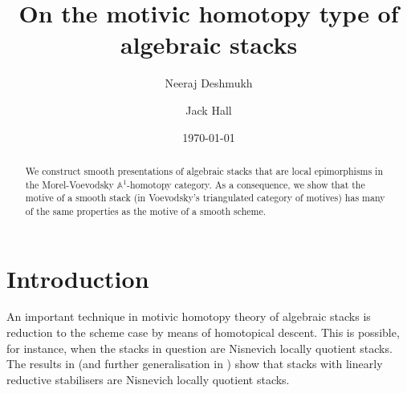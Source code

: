 \documentclass[10pt]{amsart}
\theoremstyle{plain}
\theoremstyle{definition}
\newcommand{\A}{{\mathbb A}}
\begin{document}
\title{On the motivic homotopy type of algebraic stacks}

\author{Neeraj Deshmukh}
\address{Department of Mathematics, Boyd Research and Education Center, University of Georgia, Athens, GA 30602, USA}

\author{Jack Hall}
\address{School of Mathematics \& Statistics\\The University of Melbourne\\Parkville,
  VIC, 3010\\Australia}




\date{\today}

\maketitle

\begin{abstract}
  We construct smooth presentations of algebraic stacks that are local epimorphisms in the Morel-Voevodsky $\A^1$-homotopy category. As a consequence, we show that the motive of a smooth stack (in Voevodsky's triangulated category of motives) has many of the same properties as the motive of a smooth scheme.
\end{abstract}
\section{Introduction}

An important technique in motivic homotopy theory of algebraic stacks is reduction to the scheme case by means of homotopical descent. This is possible, for instance, when the stacks in question are Nisnevich locally quotient stacks. The results in \cite{AHR19} (and further generalisation in \cite{ahhlr21}) show that stacks with linearly reductive stabilisers are Nisnevich locally quotient stacks. 
\end{document}
